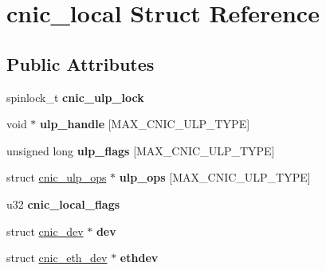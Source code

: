 \hypertarget{structcnic__local}{
\section{cnic\_\-local Struct Reference}
\label{structcnic__local}
}
\subsection*{Public Attributes}
\begin{DoxyCompactItemize}
\item 
\hypertarget{structcnic__local_a38fb90d76a818a46b574faee0c1f07e2}{
spinlock\_\-t {\bfseries cnic\_\-ulp\_\-lock}}
\label{structcnic__local_a38fb90d76a818a46b574faee0c1f07e2}

\item 
\hypertarget{structcnic__local_a3820077cfb035d12d45499ebd04fa0fb}{
void $\ast$ {\bfseries ulp\_\-handle} \mbox{[}MAX\_\-CNIC\_\-ULP\_\-TYPE\mbox{]}}
\label{structcnic__local_a3820077cfb035d12d45499ebd04fa0fb}

\item 
\hypertarget{structcnic__local_ae5fd63d5958f5fb35075f43f752b4a97}{
unsigned long {\bfseries ulp\_\-flags} \mbox{[}MAX\_\-CNIC\_\-ULP\_\-TYPE\mbox{]}}
\label{structcnic__local_ae5fd63d5958f5fb35075f43f752b4a97}

\item 
\hypertarget{structcnic__local_a80c8bfd38023c81016e5e8a22c8bc93a}{
struct \hyperlink{structcnic__ulp__ops}{cnic\_\-ulp\_\-ops} $\ast$ {\bfseries ulp\_\-ops} \mbox{[}MAX\_\-CNIC\_\-ULP\_\-TYPE\mbox{]}}
\label{structcnic__local_a80c8bfd38023c81016e5e8a22c8bc93a}

\item 
\hypertarget{structcnic__local_a4ef72290a5deed80fb0123e06c26c7f1}{
u32 {\bfseries cnic\_\-local\_\-flags}}
\label{structcnic__local_a4ef72290a5deed80fb0123e06c26c7f1}

\item 
\hypertarget{structcnic__local_a42d2afa2171320e41b0932e29639e1f5}{
struct \hyperlink{structcnic__dev}{cnic\_\-dev} $\ast$ {\bfseries dev}}
\label{structcnic__local_a42d2afa2171320e41b0932e29639e1f5}

\item 
\hypertarget{structcnic__local_a4976ce35ebbf1561c76f8c5d8ab97bc1}{
struct \hyperlink{structcnic__eth__dev}{cnic\_\-eth\_\-dev} $\ast$ {\bfseries ethdev}}
\label{structcnic__local_a4976ce35ebbf1561c76f8c5d8ab97bc1}


\end{DoxyCompactItemize}
